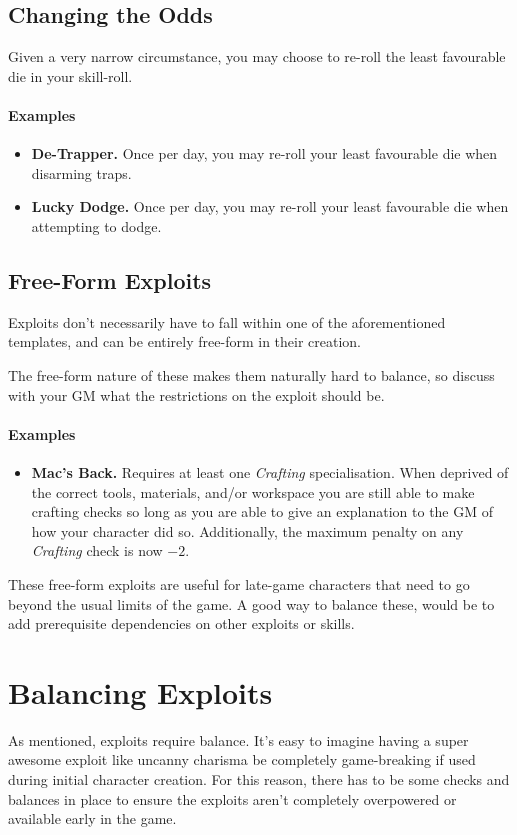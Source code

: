 \subsection{Changing the Odds}
Given a very narrow circumstance, you may choose to re-roll the least favourable die in your skill-roll.
\paragraph{Examples}
\begin{itemize}
    \item \textbf{De-Trapper.} Once per day, you may re-roll your least favourable die when disarming traps.
    \item \textbf{Lucky Dodge.} Once per day, you may re-roll your least favourable die when attempting to dodge.
\end{itemize}

\subsection{Free-Form Exploits}
Exploits don't necessarily have to fall within one of the aforementioned templates, and can be entirely free-form in their creation.

The free-form nature of these makes them naturally hard to balance, so discuss with your GM what the restrictions on the exploit should be.

\paragraph{Examples}
\begin{itemize}
    \item \textbf{Mac's Back.} Requires at least one \textit{Crafting} specialisation.
    When deprived of the correct tools, materials, and/or workspace you are still able to make crafting checks so long as you are able to give an explanation to the GM of how your character did so.
Additionally, the maximum penalty on any \textit{Crafting} check is now $-2$.
\end{itemize}

These free-form exploits are useful for late-game characters that need to go beyond the usual limits of the game. A good way to balance these, would be to add prerequisite dependencies on other exploits or skills.

\section{Balancing Exploits}\label{sec:exploit-balance}
As mentioned, exploits require balance.
It's easy to imagine having a super awesome exploit like uncanny charisma be completely game-breaking if used during initial character creation.
For this reason, there has to be some checks and balances in place to ensure the exploits aren't completely overpowered or available early in the game.

